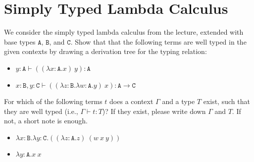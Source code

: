 \section{Simply Typed Lambda Calculus}
We consider the simply typed lambda calculus from the lecture, extended with base types $\mathtt{A}$, $\mathtt{B}$, and $\mathtt{C}$.
Show that that the following terms are well typed in the given contexts by drawing a derivation tree for the typing relation:

\begin{itemize}
  \item $y:\mathtt{A} \vdash ((\lambda{x:\mathtt{A}}.x)\ y) : \mathtt{A}$
  \item $x:\mathtt{B}, y:\mathtt{C} \vdash ((\lambda{z:\mathtt{B}}.\lambda{w:\mathtt{A}}.y)\ x) : \mathtt{A} \to \mathtt{C}$
\end{itemize}
For which of the following terms $t$ does a context $\Gamma$ and a type $T$ exist,
such that they are well typed (i.e., $\Gamma\vdash t : T$)?
If they exist, please write down \(\Gamma\) and \(T\). If not, a short note is enough.
\begin{itemize}
  \item $\lambda{x:\mathtt{B}}.\lambda{y:\mathtt{C}}.((\lambda{z:\mathtt{A}.z})~(w~x~y))$
  \item $\lambda{y:\mathtt{A}}.x~x$
\end{itemize}

